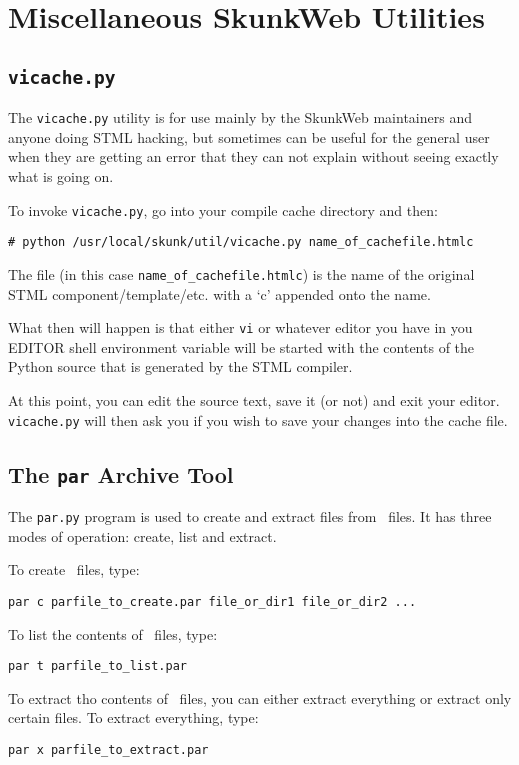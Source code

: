 \documentclass[titlepage]{manual}
\begin{document}
\chapter{Miscellaneous SkunkWeb Utilities}
\section{\texttt{vicache.py}}
The \texttt{vicache.py} utility is for use mainly by the SkunkWeb maintainers
and anyone doing STML hacking, but sometimes can be useful for the general
user when they are getting an error that they can not explain without
seeing exactly what is going on.

To invoke \texttt{vicache.py}, go into your compile cache directory
and then:
\begin{verbatim}
# python /usr/local/skunk/util/vicache.py name_of_cachefile.htmlc
\end{verbatim}
The file (in this case \texttt{name\_of\_cachefile.htmlc}) is the name
of the original STML component/template/etc. with a `c' appended onto
the name.  

What then will happen is that either \texttt{vi} or whatever editor you
have in you EDITOR shell environment variable will be started with the
contents of the Python source that is generated by the STML compiler.

At this point, you can edit the source text, save it (or not) and exit your
editor.  \texttt{vicache.py} will then ask you if you wish to save your
changes into the cache file.


\section{The \texttt{par} Archive Tool}
\label{pardotpy}
The \texttt{par.py} program is used to create and extract files from
\PAR\ files.  It has three modes of operation: create, list and
extract.

To create \PAR\ files, type:
\begin{verbatim}
par c parfile_to_create.par file_or_dir1 file_or_dir2 ...
\end{verbatim}

To list the contents of \PAR\ files, type:
\begin{verbatim}
par t parfile_to_list.par
\end{verbatim}

To extract tho contents of \PAR\ files, you can either extract
everything or extract only certain files.  To extract everything,
type:
\begin{verbatim}
par x parfile_to_extract.par
\end{verbatim}
\end{document}
